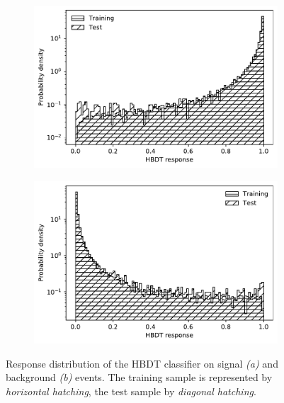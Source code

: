 \begin{figure}[t]
	\centering
	\begin{subfigure}{.45\textwidth}
		\includegraphics[width=\textwidth]{graphics/04-event_selection/sig_train_vs_test.pdf}
		\caption{}
		\label{fig:4:sig_train_vs_test}
	\end{subfigure}
	\begin{subfigure}{.45\textwidth}
		\includegraphics[width=\textwidth]{graphics/04-event_selection/bkg_train_vs_test.pdf}
		\caption{}
		\label{fig:4:bkg_train_vs_test}
	\end{subfigure}
	\caption{Response distribution of the HBDT classifier on signal \textit{(a)} and background \textit{(b)} events. The training sample is represented by \textit{horizontal hatching}, the test sample by \textit{diagonal hatching}.}
	\label{fig:4:train_vs_test}
\end{figure}

